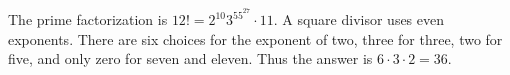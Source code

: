 The prime factorization is $12!=2^{10}3^55^27\cdot11$. A square divisor uses even exponents. There are six choices for the exponent of two, three for three, two for five, and only zero for seven and eleven. Thus the answer is $\boxed{6\cdot3\cdot2=36}$.
